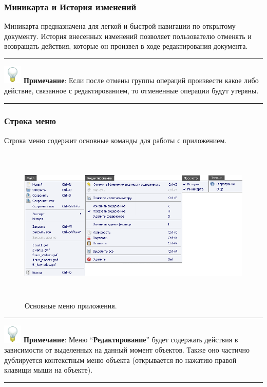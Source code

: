 \subsubsection{Миникарта и История изменений}

Миникарта предназначена для легкой и быстрой навигации по открытому документу. История внесенных изменений позволяет пользователю отменять и возвращать действия, которые он произвел в ходе редактирования документа.

\hrule\smallskip
\noindent\includegraphics[width=25pt, height=25pt]{../images/lamp.png} \textcolor[rgb]{.25, .67, .2}{\textbf{Примечание}: Если после отмены группы операций произвести какое либо действие, связанное с редактированием, то отмененные операции будут утеряны.}
\smallskip
\hrule

\subsubsection{Строка меню}

Строка меню содержит основные команды для работы с приложением.
\begin{figure}[h]
	\includegraphics[width=16.22cm, height=7.51cm]{../images/menus.png}
	\caption{Основные меню приложения.}
	\label{menus}
\end{figure}

\hrule
\smallskip
\noindent\includegraphics[width=25pt, height=25pt]{../images/lamp.png} \textcolor[rgb]{.25, .67, .2}{\textbf{Примечание}: Меню “\textbf{Редактирование}” будет содержать действия в зависимости от выделенных на данный момент объектов. Также оно частично дублируется контекстным меню объекта (открывается по нажатию правой клавищи мыши на объекте).}
\smallskip
\hrule

